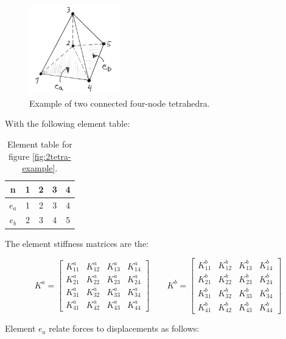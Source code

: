 \begin{figure}
  \centering
  \includegraphics[width=4cm]{./images/finite_element_method_two_tetrahedrons.png}
\caption{Example of two connected four-node tetrahedra.}
\label{fig:2tetra-example}
\end{figure}

With the following element table:

\begin{table}
  \centering
\begin{tabular}{c|c|c|c|c|}
n & 1 & 2 & 3 & 4 \\
\hline
$e_a$ & 1 & 2 & 3 & 4 \\
$e_b$ & 2 & 3 & 4 & 5 \\
\hline
\end{tabular}
\caption{Element table for figure \vref{fig:2tetra-example}.}
\label{table:element-table-for-example}
\end{table}

The element stiffness matrices are the:

\begin{equation}
K^a =
\begin{bmatrix}
K^a_{11} & K^a_{12} & K^a_{13} & K^a_{14} \\
K^a_{21} & K^a_{22} & K^a_{23} & K^a_{24} \\
K^a_{31} & K^a_{32} & K^a_{33} & K^a_{34} \\
K^a_{41} & K^a_{42} & K^a_{43} & K^a_{44}
\end{bmatrix}
\qquad
K^b =
\begin{bmatrix}
K^b_{11} & K^b_{12} & K^b_{13} & K^b_{14} \\
K^b_{21} & K^b_{22} & K^b_{23} & K^b_{24} \\
K^b_{31} & K^b_{32} & K^b_{33} & K^b_{34} \\
K^b_{41} & K^b_{42} & K^b_{43} & K^b_{44}
\end{bmatrix}
\end{equation}

Element $e_a$ relate forces to displacements as follows:

